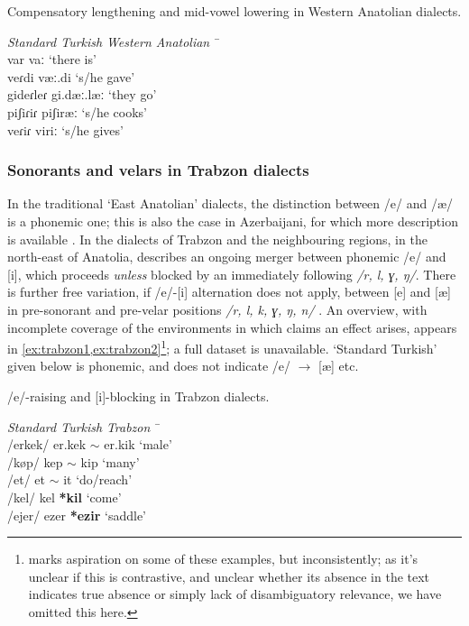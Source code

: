 \begin{example}\label{ex:anatolian} Compensatory lengthening and mid-vowel lowering in Western Anatolian dialects. \citep[p.~241]{Sezer1986}
\begin{tabbing}
  \textit{Standard Turkish} \tab[2cm] \= \textit{Western Anatolian} \tab[2cm] \= \ \\
  var \tab[2cm] \> vaː \tab[2cm] \> `there is'\\
  veɾdi  \> væː.di \> `s/he gave'\\
  gideɾleɾ \> gi.dæː.læː \> `they go' \\
  piʃiɾiɾ \> piʃiræː \> `s/he cooks' \\
  veɾiɾ \> viriː \> `s/he gives'
\end{tabbing}
\end{example}

\subsubsection{Sonorants and velars in Trabzon dialects}\label{tr_trabzon}

In the traditional `East Anatolian' dialects, the distinction between /e/ and /æ/ is a phonemic one; this is also the case in Azerbaijani, for which more description is available \citep{Dehghani2000,Schoenig1998Azer}.  In the dialects of Trabzon and the neighbouring regions, in the north-east of Anatolia, \cite[p.~53]{Brendemoen2002} describes an ongoing merger between phonemic /e/ and [i], which proceeds \emph{unless} blocked by an immediately following \emph{/r, l, ɣ, ŋ/}. There is further free variation, if /e/-[i] alternation does not apply, between [e] and [æ] in pre-sonorant and pre-velar positions \emph{/r, l, k, ɣ, ŋ, n/} \citep[p.~55]{Brendemoen2002}. An overview, with incomplete coverage of the environments in which \citeauthor{Brendemoen2002} claims an effect arises, appears in \cref{ex:trabzon1,ex:trabzon2}\footnote{\citet{Brendemoen2002} marks aspiration on some of these examples, but inconsistently; as it's unclear if this is contrastive, and unclear whether its absence in the text indicates true absence or simply lack of disambiguatory relevance, we have omitted this here.}; a full dataset is unavailable. `Standard Turkish' given below is phonemic, and does not indicate /e/ $\rightarrow$ [æ] etc.

\begin{example}\label{ex:trabzon1} /e/-raising and [i]-blocking in Trabzon dialects.
\begin{tabbing}
  \textit{Standard Turkish} \tab[2cm] \= \textit{Trabzon} \tab[2cm] \= \ \\
  /erkek/ \> er.kek $\sim$ er.kik \> `male'\\
  /køp/\footnotemark  \> kep $\sim$ kip \> `many'\\
  /et/ \> et $\sim$ it \> `do/reach' \\
  /kel/ \> kel \textbf{*kil} \> `come' \\
  /ejer/ \> ezer \textbf{*ezir} \> `saddle'
\end{tabbing}
\end{example}

